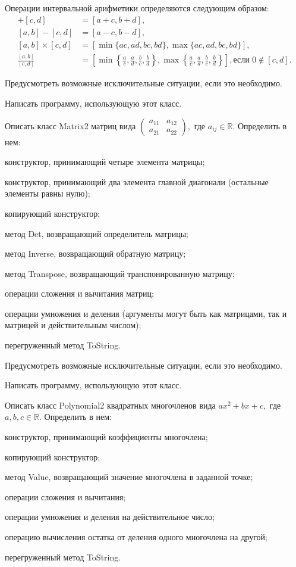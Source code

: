Операции интервальной арифметики определяются следующим образом:
\begin{align*}
  [a, b] + [c, d] &= [a + c, b + d],\\
  [a, b] - [c, d] &= [a - c, b - d],\\
  [a, b] \times [c, d] &=
  [\min \{ac, ad, bc, bd\}, \max \{ac, ad, bc, bd\}],\\
  \frac{[a, b]}{[c, d]} &=
  \left[
    \min \left\{\frac{a}{c}, \frac{a}{d}, \frac{b}{c}, \frac{b}{d}\right\},
    \max \left\{\frac{a}{c}, \frac{a}{d}, \frac{b}{c}, \frac{b}{d}\right\}
    \right], \textrm{если } 0\not\in[c, d].
\end{align*}

Предусмотреть возможные исключительные ситуации, если это необходимо.

Написать программу, использующую этот класс.

\task Описать класс Matrix2 матриц вида
$\begin{pmatrix}
a_{11} & a_{12} \\
a_{21} & a_{22}
\end{pmatrix},$ где $a_{ij} \in \mathbb{R}$. Определить в нем:
\begin{itemize*}
\item конструктор, принимающий четыре элемента матрицы;
\item конструктор, принимающий два элемента главной диагонали
  (остальные элементы равны нулю);
\item копирующий конструктор;
\item метод Det, возвращающий определитель матрицы;
\item метод Inverse, возвращающий обратную матрицу;
\item метод Transpose, возвращающий транспонированную матрицу;
\item операции сложения и вычитания матриц;
\item операции умножения и деления (аргументы могут быть как матрицами,
  так и матрицей и действительным числом);
\item перегруженный метод ToString.
\end{itemize*}

Предусмотреть возможные исключительные ситуации, если это необходимо.

Написать программу, использующую этот класс.

\task Описать класс Polynomial2 квадратных многочленов вида
$ax^2+bx+c,$ где $a,b,c \in \mathbb{R}$. Определить в нем:
\begin{itemize*}
\item конструктор, принимающий коэффициенты многочлена;
\item копирующий конструктор;
\item метод Value, возвращающий значение многочлена в заданной точке;
\item операции сложения и вычитания;
\item операции умножения и деления на действительное число;
\item операцию вычисления остатка от деления одного многочлена на
  другой;
\item перегруженный метод ToString.
\end{itemize*}

